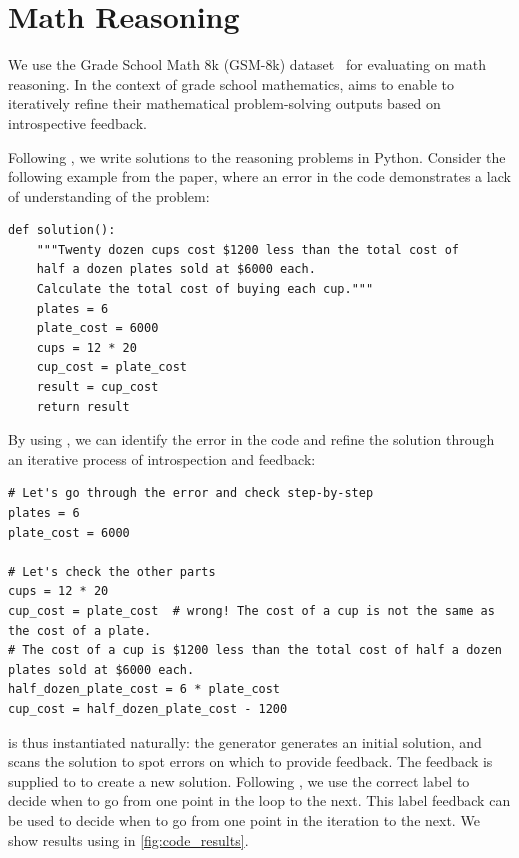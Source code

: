\section{Math Reasoning}
\label{section:gsm}

We use the Grade School Math 8k (GSM-8k) dataset~\citep{cobbe2021training} for evaluating \ours on math reasoning. In the context of grade school mathematics, \ours aims to enable \llms to iteratively refine their mathematical problem-solving outputs based on introspective feedback.

Following \citet{gao2022pal}, we write solutions to the reasoning problems in Python. Consider the following example from the paper, where an error in the code demonstrates a lack of understanding of the problem:
\begin{verbatim}
def solution():
    """Twenty dozen cups cost $1200 less than the total cost of 
    half a dozen plates sold at $6000 each.
    Calculate the total cost of buying each cup."""
    plates = 6
    plate_cost = 6000
    cups = 12 * 20
    cup_cost = plate_cost
    result = cup_cost
    return result
\end{verbatim}

By using \ours, we can identify the error in the code and refine the solution through an iterative process of introspection and feedback:

\begin{verbatim}
# Let's go through the error and check step-by-step
plates = 6
plate_cost = 6000

# Let's check the other parts
cups = 12 * 20
cup_cost = plate_cost  # wrong! The cost of a cup is not the same as the cost of a plate.
# The cost of a cup is $1200 less than the total cost of half a dozen plates sold at $6000 each.
half_dozen_plate_cost = 6 * plate_cost
cup_cost = half_dozen_plate_cost - 1200
\end{verbatim}


\ours is thus instantiated naturally: the generator generates an initial solution, and \fbmod scans the solution to spot errors on which to provide feedback.
The feedback is supplied to \itermod to create a new solution.
Following \citet{Welleck2022SelfCorrect}, we use the correct label to decide when to go from one point in the loop to the next.
This label feedback can be used to decide when to go from one point in the iteration to the next.
We show results using \ours in \autoref{fig:code_results}.

